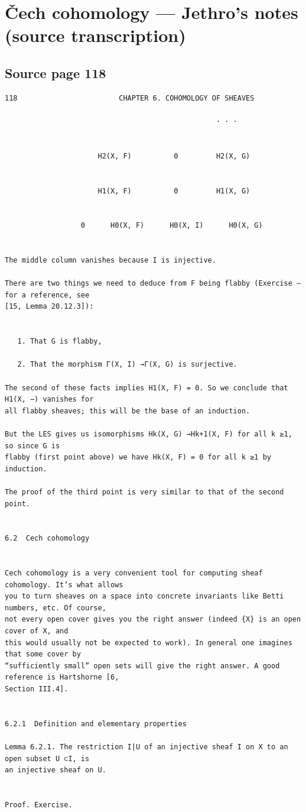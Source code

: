 \section{\v{C}ech cohomology --- Jethro's notes (source transcription)}
\label{section-cech-jethro-transcription}

\subsection*{Source page 118}
\begin{Verbatim}[fontsize=\small]
118                        CHAPTER 6. COHOMOLOGY OF SHEAVES

                                                  · · ·


                      H2(X, F)          0         H2(X, G)


                      H1(X, F)          0         H1(X, G)


                  0      H0(X, F)      H0(X, I)      H0(X, G)


The middle column vanishes because I is injective.

There are two things we need to deduce from F being flabby (Exercise – for a reference, see
[15, Lemma 20.12.3]):


   1. That G is flabby,

   2. That the morphism Γ(X, I) →Γ(X, G) is surjective.

The second of these facts implies H1(X, F) = 0. So we conclude that H1(X, −) vanishes for
all flabby sheaves; this will be the base of an induction.

But the LES gives us isomorphisms Hk(X, G) →Hk+1(X, F) for all k ≥1, so since G is
flabby (first point above) we have Hk(X, F) = 0 for all k ≥1 by induction.

The proof of the third point is very similar to that of the second point.


6.2  Cech cohomology


Cech cohomology is a very convenient tool for computing sheaf cohomology. It’s what allows
you to turn sheaves on a space into concrete invariants like Betti numbers, etc. Of course,
not every open cover gives you the right answer (indeed {X} is an open cover of X, and
this would usually not be expected to work). In general one imagines that some cover by
“sufficiently small” open sets will give the right answer. A good reference is Hartshorne [6,
Section III.4].


6.2.1  Definition and elementary properties

Lemma 6.2.1. The restriction I|U of an injective sheaf I on X to an open subset U ⊂I, is
an injective sheaf on U.


Proof. Exercise.
\end{Verbatim}

